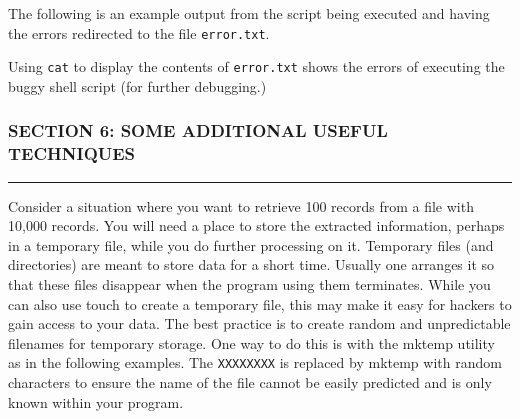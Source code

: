 \begin{Shaded}
\begin{Highlighting}[]
\CommentTok{#}
  
  \NormalTok{(}\NormalTok{+}\NormalTok{))}
 
 
\end{Highlighting}
\end{Shaded}

The following is an example output from the script being executed and
having the errors redirected to the file \texttt{error.txt}.

\begin{Shaded}
\begin{Highlighting}[]
\NormalTok{$ } 
\NormalTok{$ }  
\NormalTok{$ } 
\NormalTok{$ } 
\end{Highlighting}
\end{Shaded}

Using \texttt{cat} to display the contents of \texttt{error.txt} shows
the errors of executing the buggy shell script (for further debugging.)

\subsubsection{SECTION 6: SOME ADDITIONAL USEFUL
TECHNIQUES}\label{section-6-some-additional-useful-techniques}

\begin{center}\rule{3in}{0.4pt}\end{center}

Consider a situation where you want to retrieve 100 records from a file
with 10,000 records. You will need a place to store the extracted
information, perhaps in a temporary file, while you do further
processing on it. Temporary files (and directories) are meant to store
data for a short time. Usually one arranges it so that these files
disappear when the program using them terminates. While you can also use
touch to create a temporary file, this may make it easy for hackers to
gain access to your data. The best practice is to create random and
unpredictable filenames for temporary storage. One way to do this is
with the mktemp utility as in the following examples. The
\texttt{XXXXXXXX} is replaced by mktemp with random characters to ensure
the name of the file cannot be easily predicted and is only known within
your program.


